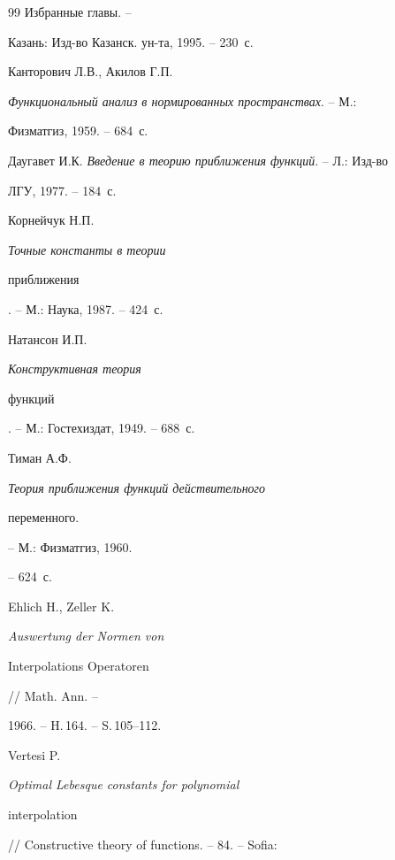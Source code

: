 \begin{thebibliography}{99}
{Избранные главы}. --


Казань: Изд-во Казанск. ун-та, 1995. -- 230~с.







Канторович Л.В., Акилов Г.П.


{\it Функциональный анализ в нормированных пространствах}. -- М.:


Физматгиз, 1959. -- 684~с.







Даугавет И.К. {\it Введение в теорию приближения функций}. -- Л.: Изд-во


ЛГУ, 1977. -- 184~с.







Корнейчук Н.П. {\it Точные константы в теории 


приближения}. -- М.: Наука, 1987. -- 424~с.







Натансон И.П. {\it Конструктивная теория 


функций}. -- М.: Гостехиздат, 1949. -- 688~с.







Тиман А.Ф. {\it Теория приближения функций действительного 


переменного.} -- М.: Физматгиз, 1960.


-- 624~с.







Ehlich H., Zeller K. {\it Auswertung der Normen von 


Interpolations Operatoren} // Math. Ann. --


1966. -- H.\,164. -- S.\,105--112.







Vertesi P. {\it Optimal Lebesque constants for polynomial 


interpolation} // Constructive theory of functions. -- 84. -- Sofia:



\end{thebibliography}
